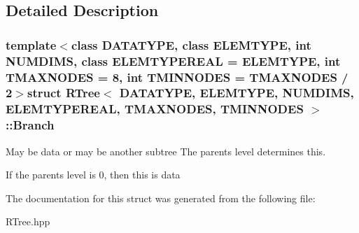 \subsection{\-Detailed \-Description}
\subsubsection*{template$<$class \-D\-A\-T\-A\-T\-Y\-P\-E, class \-E\-L\-E\-M\-T\-Y\-P\-E, int \-N\-U\-M\-D\-I\-M\-S, class \-E\-L\-E\-M\-T\-Y\-P\-E\-R\-E\-A\-L = \-E\-L\-E\-M\-T\-Y\-P\-E, int \-T\-M\-A\-X\-N\-O\-D\-E\-S = 8, int \-T\-M\-I\-N\-N\-O\-D\-E\-S = \-T\-M\-A\-X\-N\-O\-D\-E\-S / 2$>$struct R\-Tree$<$ D\-A\-T\-A\-T\-Y\-P\-E, E\-L\-E\-M\-T\-Y\-P\-E, N\-U\-M\-D\-I\-M\-S, E\-L\-E\-M\-T\-Y\-P\-E\-R\-E\-A\-L, T\-M\-A\-X\-N\-O\-D\-E\-S, T\-M\-I\-N\-N\-O\-D\-E\-S $>$\-::\-Branch}

\-May be data or may be another subtree \-The parents level determines this. 

\-If the parents level is 0, then this is data 

\-The documentation for this struct was generated from the following file\-:\begin{DoxyCompactItemize}
\item 
\-R\-Tree.\-hpp\end{DoxyCompactItemize}
